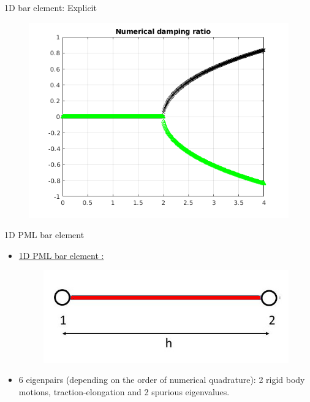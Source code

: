 \begin{frame}{1D bar element: Explicit}
\begin{figure}[ht]
\begin{minipage}[b]{0.5\linewidth}
  \end{minipage}%
  \begin{minipage}[b]{0.5\linewidth}
    \centering
    \includegraphics[scale=.35]{images/bar-exp-4.png} \\

  \end{minipage} 
\end{figure}
\end{frame}


\begin{frame}{1D PML bar element}
\begin{itemize}
\item \underline{1D PML bar element :}
\begin{figure}
\centering
\includegraphics[width=0.5\linewidth]{images/bar-element-pml.jpg}
\end{figure}
\item 6 eigenpairs (depending on the order of numerical quadrature): 2 rigid body motions, traction-elongation and 2 spurious eigenvalues.
\end{itemize}
\end{frame}

